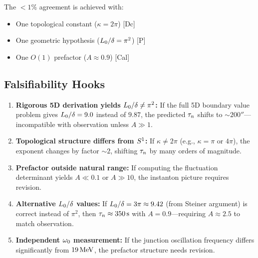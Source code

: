 The $< 1\%$ agreement is achieved with:
\begin{itemize}
    \item One topological constant ($\kappa = 2\pi$) [Dc]
    \item One geometric hypothesis ($L_0/\delta = \pi^2$) [P]
    \item One $O(1)$ prefactor ($A \approx 0.9$) [Cal]
\end{itemize}

\subsection{Falsifiability Hooks}

\begin{edcopenbox}[title=Falsifiability Conditions]
    \begin{enumerate}
        \item \textbf{Rigorous 5D derivation yields $L_0/\delta \neq \pi^2$:}
              If the full 5D boundary value problem gives $L_0/\delta = 9.0$
              instead of $9.87$, the predicted $\tau_n$ shifts to $\sim 200\second$---
              incompatible with observation unless $A \gg 1$.

        \item \textbf{Topological structure differs from $S^1$:}
              If $\kappa \neq 2\pi$ (e.g., $\kappa = \pi$ or $4\pi$), the
              exponent changes by factor $\sim 2$, shifting $\tau_n$ by
              many orders of magnitude.

        \item \textbf{Prefactor outside natural range:}
              If computing the fluctuation determinant yields $A \ll 0.1$
              or $A \gg 10$, the instanton picture requires revision.

        \item \textbf{Alternative $L_0/\delta$ values:}
              If $L_0/\delta = 3\pi \approx 9.42$ (from Steiner argument)
              is correct instead of $\pi^2$, then $\tau_n \approx 350\,\mathrm{s}$
              with $A = 0.9$---requiring $A \approx 2.5$ to match observation.

        \item \textbf{Independent $\omega_0$ measurement:}
              If the junction oscillation frequency differs significantly
              from $19\,\mathrm{MeV}$, the prefactor structure needs revision.
    \end{enumerate}
\end{edcopenbox}

